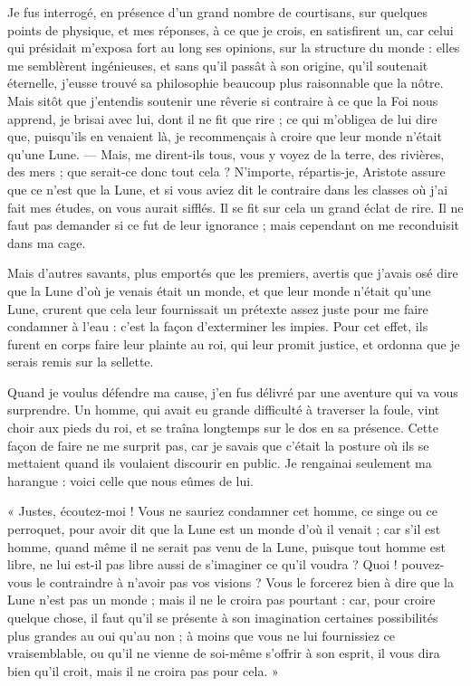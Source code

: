 \documentclass[a4paper, 11pt, oneside]{article}
\begin{document}
Je fus interrogé, en présence d'un grand nombre de courtisans, sur quelques points de physique, et mes réponses, à ce que je crois, en satisfirent un, car celui qui présidait m'exposa fort au long ses opinions, sur la structure du monde : elles me semblèrent ingénieuses, et sans qu'il passât à son origine, qu'il soutenait éternelle, j'eusse trouvé sa philosophie beaucoup plus raisonnable que la nôtre. Mais sitôt que j'entendis soutenir une rêverie si contraire à ce que la Foi nous apprend, je brisai avec lui, dont il ne fit que rire ; ce qui m'obligea de lui dire que, puisqu'ils en venaient là, je recommençais à croire que leur monde n'était qu'une Lune. --- Mais, me dirent-ils tous, vous y voyez de la terre, des rivières, des mers ; que serait-ce donc tout cela ? N'importe, répartis-je, Aristote assure que ce n'est que la Lune, et si vous aviez dit le contraire dans les classes où j'ai fait mes études, on vous aurait sifflés. Il se fit sur cela un grand éclat de rire. Il ne faut pas demander si ce fut de leur ignorance ; mais cependant on me reconduisit dans ma cage.

Mais d'autres savants, plus emportés que les premiers, avertis que j'avais osé dire que la Lune d'où je venais était un monde, et que leur monde n'était qu'une Lune, crurent que cela leur fournissait un prétexte assez juste pour me faire condamner à l'eau : c'est la façon d'exterminer les impies. Pour cet effet, ils furent en corps faire leur plainte au roi, qui leur promit justice, et ordonna que je serais remis sur la sellette.

Quand je voulus défendre ma cause, j'en fus délivré par une aventure qui va vous surprendre. Un homme, qui avait eu grande difficulté à traverser la foule, vint choir aux pieds du roi, et se traîna longtemps sur le dos en sa présence. Cette façon de faire ne me surprit pas, car je savais que c'était la posture où ils se mettaient quand ils voulaient discourir en public. Je rengainai seulement ma harangue : voici celle que nous eûmes de lui.

« Justes, écoutez-moi ! Vous ne sauriez condamner cet homme, ce singe ou ce perroquet, pour avoir dit que la Lune est un monde d'où il venait ; car s'il est homme, quand même il ne serait pas venu de la Lune, puisque tout homme est libre, ne lui est-il pas libre aussi de s'imaginer ce qu'il voudra ? Quoi ! pouvez-vous le contraindre à n'avoir pas vos visions ? Vous le forcerez bien à dire que la Lune n'est pas un monde ; mais il ne le croira pas pourtant : car, pour croire quelque chose, il faut qu'il se présente à son imagination certaines possibilités plus grandes au oui qu'au non ; à moins que vous ne lui fournissiez ce vraisemblable, ou qu'il ne vienne de soi-même s'offrir à son esprit, il vous dira bien qu'il croit, mais il ne croira pas pour cela. »
\end{document}
